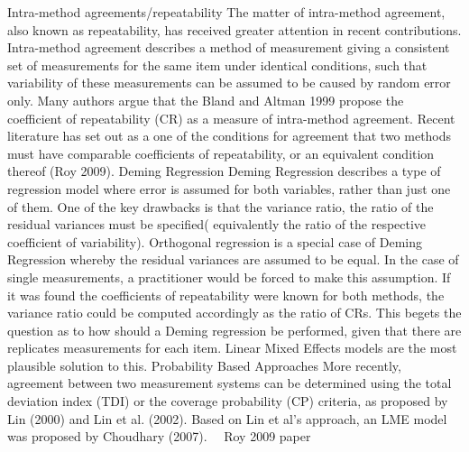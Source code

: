 Intra-method agreements/repeatability
The matter of intra-method agreement, also known as repeatability, has received greater attention in recent contributions. Intra-method agreement describes a method of measurement giving a consistent set of measurements for the same item under identical conditions, such that variability of these measurements can be assumed to be caused by random error only. Many authors argue that the
Bland and Altman 1999 propose the coefficient of repeatability (CR) as a measure of intra-method agreement. Recent literature has set out as a one of the conditions for agreement that two methods must have comparable coefficients of repeatability, or an equivalent condition thereof (Roy 2009).
Deming Regression
Deming Regression describes a type of regression model where error is assumed for both variables, rather than just one of them. One of the key drawbacks is that the variance ratio, the ratio of the residual variances must be specified( equivalently the ratio of the respective coefficient of variability).
Orthogonal regression is a special case of Deming Regression whereby the residual variances are assumed to be equal.  In the case of single measurements, a practitioner would be forced to make this assumption. If it was found the coefficients of repeatability were known for both methods, the variance ratio could be computed accordingly as the ratio of CRs.  
This begets the question as to how should a Deming regression be performed, given that there are replicates measurements for each item. Linear Mixed Effects models are the most plausible solution to this.
Probability Based Approaches
More recently, agreement between two measurement systems can be determined using the total deviation index (TDI) or the coverage probability (CP) criteria, as proposed by Lin (2000) and Lin et al. (2002). Based on Lin et al's approach, an LME model was proposed by Choudhary (2007). 
Roy 2009 paper

